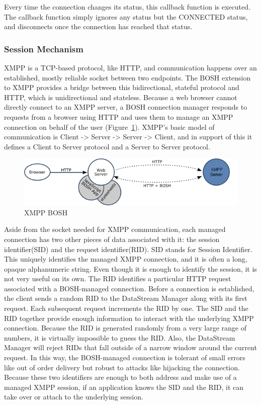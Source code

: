 Every time the connection changes its status, this callback function is executed. The callback function simply ignores any status but the CONNECTED status, and disconnects once the connection has reached that status.

\subsubsection{Session Mechanism}
XMPP is a TCP-based protocol, like HTTP, and communication happens over an established, mostly reliable socket between two endpoints. The BOSH extension to XMPP provides a bridge between this bidirectional, stateful protocol and HTTP, which is unidirectional and stateless. Because a web browser cannot directly connect to an XMPP server, a BOSH connection manager responds to requests from a browser using HTTP and uses them to manage an XMPP connection on behalf of the user (Figure~\ref{img:xmpp-bosh}).  XMPP's basic model of communication is Client -> Server -> Server -> Client, and in support of this it defines a Client to Server protocol and a Server to Server protocol.
  \begin{figure}[!ht]
  \centering
  \includegraphics[scale=0.6]{images/xmpp-bosh.png}   
  \caption[BOSH]{XMPP BOSH}
  \label{img:xmpp-bosh}                        
  \end{figure} 

Aside from the socket needed for XMPP communication, each managed connection has two other pieces of data associated with it: the session identifier(SID) and the request identifier(RID). SID stands for Session Identifier. This uniquely identifies the managed XMPP connection, and it is often a long, opaque alphanumeric string. Even though it is enough to identify the session, it is not very useful on its own. The RID identifies a particular HTTP request associated with a BOSH-managed connection. Before a connection is established, the client sends a random RID to the DataStream Manager along with its first request. Each subsequent request increments the RID by one. The SID and the RID together provide enough information to interact with the underlying XMPP connection. Because the RID is generated randomly from a very large range of numbers, it is virtually impossible to guess the RID. Also, the DataStream Manager will reject RIDs that fall outside of a narrow window around the current request. In this way, the BOSH-managed connection is tolerant of small errors like out of order delivery but robust to attacks like hijacking the connection. Because these two identifiers are enough to both address and make use of a managed XMPP session, if an application knows the SID and the RID, it can take over or attach to the underlying session.

